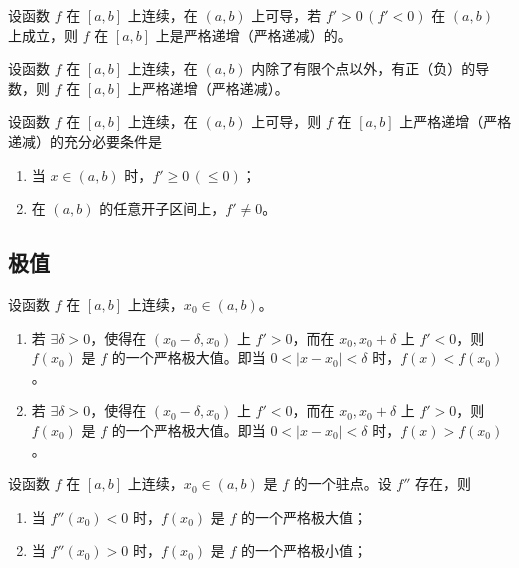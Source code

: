 \begin{theorem}
  设函数 $f$ 在 $[a,b]$ 上连续，在 $(a,b)$ 上可导，若 $f' > 0\, (f' < 0)$ 在 $(a,b)$ 上成立，则 $f$ 在 $[a,b]$ 上是严格递增（严格递减）的。
\end{theorem}

\begin{theorem}
  设函数 $f$ 在 $[a,b]$ 上连续，在 $(a,b)$ 内除了有限个点以外，有正（负）的导数，则 $f$ 在 $[a,b]$ 上严格递增（严格递减）。
\end{theorem}

\begin{theorem}
  设函数 $f$ 在 $[a,b]$ 上连续，在 $(a,b)$ 上可导，则 $f$ 在 $[a,b]$ 上严格递增（严格递减）的充分必要条件是
  \begin{enumerate}
    \item 当 $x \in (a,b)$ 时，$f' \geqslant 0\, (\leqslant 0)$；
    \item 在 $(a,b)$ 的任意开子区间上，$f' \ne 0$。
  \end{enumerate}
\end{theorem}

\subsection{极值}

\begin{theorem}
  设函数 $f$ 在 $[a,b]$ 上连续，$x_0 \in (a,b)$。
  \begin{enumerate}
    \item 若 $\exists \delta > 0$，使得在 $(x_0 - \delta,x_0)$ 上 $f' > 0$，而在 $x_0,x_0 + \delta$ 上 $f' < 0$，则 $f(x_0)$ 是 $f$ 的一个严格极大值。即当 $0 < |x - x_0| < \delta$ 时，$f(x) < f(x_0)$。
    \item 若 $\exists \delta > 0$，使得在 $(x_0 - \delta,x_0)$ 上 $f' < 0$，而在 $x_0,x_0 + \delta$ 上 $f' > 0$，则 $f(x_0)$ 是 $f$ 的一个严格极大值。即当 $0 < |x - x_0| < \delta$ 时，$f(x) > f(x_0)$。
  \end{enumerate}
\end{theorem}

\begin{theorem}
  设函数 $f$ 在 $[a,b]$ 上连续，$x_0 \in (a,b)$ 是 $f$ 的一个驻点。设 $f''$ 存在，则
  \begin{enumerate}
    \item 当 $f''(x_0) < 0$ 时，$f(x_0)$ 是 $f$ 的一个严格极大值；
    \item 当 $f''(x_0) > 0$ 时，$f(x_0)$ 是 $f$ 的一个严格极小值；
  \end{enumerate}
\end{theorem}

